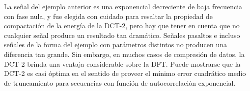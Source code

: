 \documentclass[a4paper]{report}
\begin{document}
La señal del ejemplo anterior es una exponencial decreciente de baja frecuencia con fase nula, y fue elegida con cuidado para resaltar la propiedad de compactación de la energía de la DCT-2, pero hay que tener en cuenta que no cualquier señal produce un resultado tan dramático. Señales pasaltos e incluso señales de la forma del ejemplo con parámetros distintos no producen una diferencia tan grande. Sin embargo, en muchos casos de compresión de datos, la DCT-2 brinda una ventaja considerable sobre la DFT. Puede mostrarse que la DCT-2 es casi óptima en el sentido de proveer el mínimo error cuadrático medio de truncamiento para secuencias con función de autocorrelación exponencial. 

















































































 
 
 
 
 
 
 
 
 
 
\end{document}
